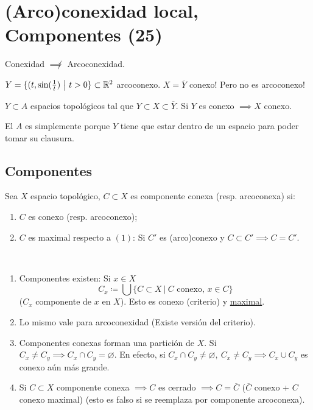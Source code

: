 \section{(Arco)conexidad local, Componentes (25)}

\begin{observe}
	Conexidad $\not\implies$ Arcoconexidad.
\end{observe}
\begin{eg}
	$Y = \{(t,\sin(\frac{1}{t}) \ \big| \ t > 0\} \subset \mathbb{R}^2$ arcoconexo. $X = \overline{Y}$ conexo! Pero no es arcoconexo! 
\end{eg}

\begin{lemma}
	$Y \subset A$ espacios topológicos tal que $Y \subset X \subset \overline{Y}$. Si $Y$ es conexo $\implies X$ conexo.
\end{lemma}
\begin{note}
	El $A$ es simplemente porque $Y$ tiene que estar dentro de un espacio para poder tomar su clausura.
\end{note}

\subsection*{Componentes}
\medskip
\begin{definition}
	Sea $X$ espacio topológico, $C \subset X$ es componente conexa (resp. arcoconexa) si:
	\begin{enumerate}
		\item $C$ es conexo (resp. arcoconexo);

		\item $C$ es maximal respecto a $(1)$: Si $C'$ es (arco)conexo y $C \subset C' \implies C = C'$.
	\end{enumerate}
\end{definition}

\begin{observe}~
	\begin{enumerate}
		\item Componentes existen: Si $x \in X$
		\[ C_x \coloneq \bigcup \{C \subset X \ \big| \ C \text{ conexo, } x \in C\} \]
		($C_x$ componente de $x$ en $X$). Esto es conexo (criterio) y \underline{maximal}.

		\item Lo mismo vale para arcoconexidad (Existe versión del criterio).

		\item Componentes conexas forman una partición de $X$. Si $C_x \neq C_y \implies C_x \cap C_y = \varnothing$. En efecto, si $C_x \cap C_y \neq \varnothing,\ C_x \neq C_y \implies C_x \cup C_y$ es conexo aún más grande.

		\item Si $C \subset X$ componente conexa $\implies C$ es cerrado $\implies C = \overline{C}$ ($\overline{C}$ conexo + $C$ conexo maximal) (esto es falso si se reemplaza por componente arcoconexa).
	\end{enumerate}
\end{observe}

